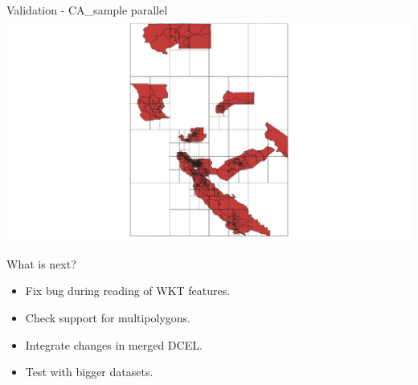 \documentclass{beamer}
\begin{document}
\begin{frame}{Validation - CA\_sample parallel}
    \centering 
    \includegraphics[width=\linewidth]{figures/CA_test} 
\end{frame}

\begin{frame}{What is next?}
    \begin{itemize}
        \item Fix bug during reading of WKT features.
        \item Check support for multipolygons.
        \item Integrate changes in merged DCEL.
        \item Test with bigger datasets.
    \end{itemize}
\end{frame}
\end{document}
